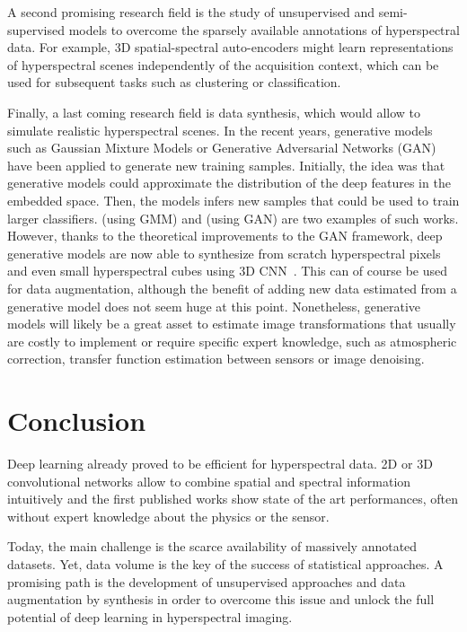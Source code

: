 \documentclass[journal]{IEEEtran}
\begin{document}
A second promising research field is the study of unsupervised and semi-supervised models to overcome the sparsely available annotations of hyperspectral data. For example, 3D spatial-spectral auto-encoders might learn representations of hyperspectral scenes independently of the acquisition context, which can be used for subsequent tasks such as clustering or classification.



Finally, a last coming research field is data synthesis, which would allow to simulate realistic hyperspectral scenes. In the recent years, generative models such as Gaussian Mixture Models or Generative Adversarial Networks (GAN) have been applied to generate new training samples. Initially, the idea was that generative models could approximate the distribution of the deep features in the embedded space. Then, the models infers new samples that could be used to train larger classifiers. \cite{davari_gmm-based_2018} (using GMM) and \cite{he_generative_2017} (using GAN) are two examples of such works. However, thanks to the theoretical improvements to the GAN framework, deep generative models are now able to synthesize from scratch hyperspectral pixels~\cite{audebert_generative_2018} and even small hyperspectral cubes using 3D CNN~\cite{zhu_generative_2018}. This can of course be used for data augmentation, although the benefit of adding new data estimated from a generative model does not seem huge at this point. Nonetheless, generative models will likely be a great asset to estimate image transformations that usually are costly to implement or require specific expert knowledge, such as atmospheric correction, transfer function estimation between sensors or image denoising.







\section{Conclusion}

Deep learning already proved to be efficient for hyperspectral data. 2D or 3D convolutional networks allow to combine spatial and spectral information intuitively and the first published works show state of the art performances, often without expert knowledge about the physics or the sensor.

Today, the main challenge is the scarce availability of massively annotated datasets. Yet, data volume is the key of the success of statistical approaches. A promising path is the development of unsupervised approaches and data augmentation by synthesis in order to overcome this issue and unlock the full potential of deep learning in hyperspectral imaging.
\end{document}
